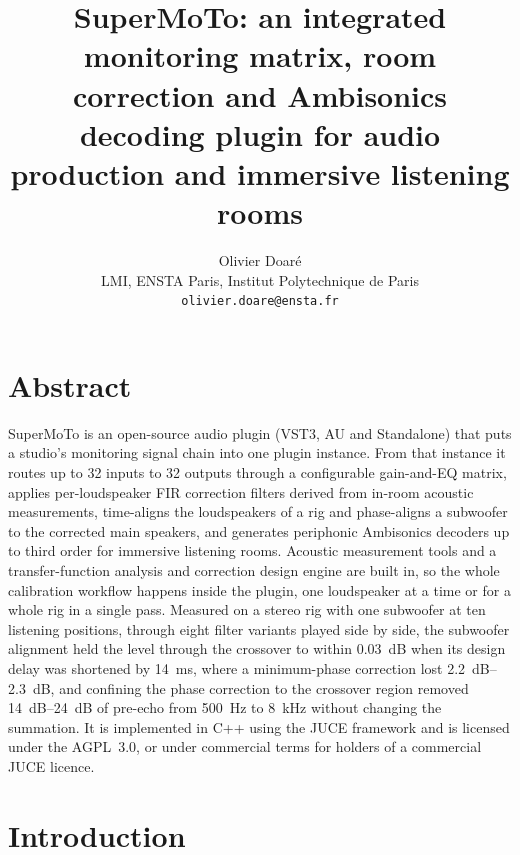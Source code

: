 \documentclass[10pt,a4paper]{article}
\title{\textbf{SuperMoTo: an integrated monitoring matrix, room correction
       and Ambisonics decoding plugin for audio production and immersive
       listening rooms}}
\author{Olivier Doaré\\
  \small LMI, ENSTA Paris, Institut Polytechnique de Paris\\
  \small \texttt{olivier.doare@ensta.fr}
}
\begin{document}
\maketitle

\section*{Abstract}

SuperMoTo is an open-source audio plugin (VST3, AU and Standalone) that puts a studio's monitoring signal chain into one plugin instance. From that instance it routes up to 32 inputs to 32 outputs through a configurable gain-and-EQ matrix, applies per-loudspeaker FIR correction filters derived from in-room acoustic measurements, time-aligns the loudspeakers of a rig and phase-aligns a subwoofer to the corrected main speakers, and generates periphonic Ambisonics decoders up to third order for immersive listening rooms. Acoustic measurement tools and a transfer-function analysis and correction design engine are built in, so the whole calibration workflow happens inside the plugin, one loudspeaker at a time or for a whole rig in a single pass. Measured on a stereo rig with one subwoofer at ten listening positions, through eight filter variants played side by side, the subwoofer alignment held the level through the crossover to within \SI{0.03}{\dB} when its design delay was shortened by \SI{14}{\milli\second}, where a minimum-phase correction lost \SIrange{2.2}{2.3}{\dB}, and confining the phase correction to the crossover region removed \SIrange{14}{24}{\dB} of pre-echo from \SI{500}{\hertz} to \SI{8}{\kilo\hertz} without changing the summation. It is implemented in C++ using the JUCE framework and is licensed under the AGPL~3.0, or under commercial terms for holders of a commercial JUCE licence.

\section{Introduction}\label{sec:intro}
\end{document}
